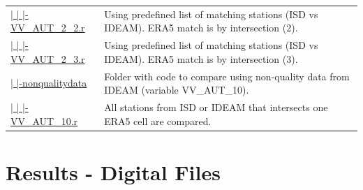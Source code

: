 \documentclass[12pt,oneside]{reedthesis}
\begin{document}
\begin{longtable}[t]{>{\raggedright\arraybackslash}p{1.3in}>{\raggedright\arraybackslash}p{4.9in}}
\href{ftp://ftp.geocorp.co/windthesis/code/downscaling/qualitydata/comparing_VV_AUT_2_2.r}{  |    |    |-VV\_AUT\_2\_2.r} & Using predefined list of matching stations (ISD vs IDEAM). ERA5 match is by intersection (2).\\
\href{ftp://ftp.geocorp.co/windthesis/code/downscaling/qualitydata/comparing_VV_AUT_2_3.r}{  |    |    |-VV\_AUT\_2\_3.r} & Using predefined list of matching stations (ISD vs IDEAM). ERA5 match is by intersection (3).\\
\href{ftp://ftp.geocorp.co/windthesis/code/downscaling/nonqualitydata/}{  |    |-nonqualitydata} & Folder with code to compare using non-quality data from IDEAM (variable VV\_AUT\_10).\\
\href{ftp://ftp.geocorp.co/windthesis/code/downscaling/nonqualitydata/comparing_VV_AUT_10.r}{  |    |    |-VV\_AUT\_10.r} & All stations from ISD or IDEAM that intersects one ERA5 cell are compared.\\
\bottomrule
\end{longtable}
\endgroup{}

\hypertarget{results}{%
\chapter{Results - Digital Files}\label{results}}
\end{document}
